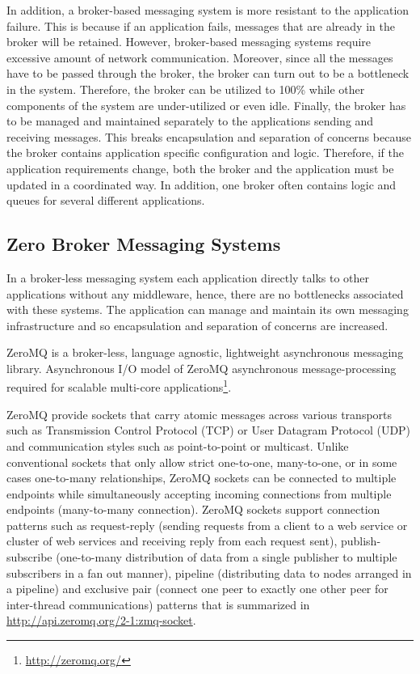 \documentclass[a4paper,11pt,twoside]{report}
\begin{document}
In addition, a broker-based messaging system is more resistant to the application failure. This is because if an application fails, messages that are already in the broker will be retained. However, broker-based messaging systems require excessive amount of network communication. Moreover, since all the messages have to be passed through the broker, the broker can turn out to be a bottleneck in the system. Therefore, the broker can be utilized to 100\% while other components of the system are under-utilized or even idle. Finally, the broker has to be managed and maintained separately to the applications sending and receiving messages. This breaks encapsulation and separation of concerns because the broker contains application specific configuration and logic. Therefore, if the application requirements change, both the broker and the application must be updated in a coordinated way. In addition, one broker often contains logic and queues for several different applications.

\subsection{Zero Broker Messaging Systems} 
In a broker-less messaging system each application directly talks to other applications without any middleware, hence, there are no bottlenecks associated with these systems. The application can manage and maintain its own messaging infrastructure and so encapsulation and separation of concerns are increased.

ZeroMQ is a broker-less, language agnostic, lightweight asynchronous messaging library. Asynchronous I/O model of ZeroMQ asynchronous message-processing required for scalable multi-core applications\footnote{\label{ZeroMQ_2} \url{http://zeromq.org/}}. 

ZeroMQ provide sockets that carry atomic messages across various transports such as Transmission Control Protocol (TCP) or User Datagram Protocol (UDP) and communication styles such as point-to-point or multicast. Unlike conventional sockets that only allow strict one-to-one, many-to-one, or in some cases one-to-many relationships, ZeroMQ sockets can be connected to multiple endpoints while simultaneously accepting incoming connections from multiple endpoints (many-to-many connection). ZeroMQ sockets support connection patterns such as request-reply (sending requests from a client to a web service or cluster of web services and receiving reply from each request sent), publish-subscribe (one-to-many distribution of data from a single publisher to multiple subscribers in a fan out manner), pipeline (distributing data to nodes arranged in a pipeline) and exclusive pair (connect one peer to exactly one other peer for inter-thread communications) patterns that is summarized in \url{http://api.zeromq.org/2-1:zmq-socket}.      
\end{document}
